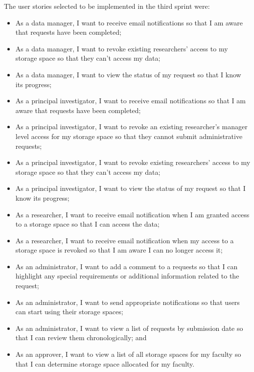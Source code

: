 \documentclass[a4paper,titlepage,12pt]{article}
\begin{document}
The user stories selected to be implemented in the third sprint were:

\begin{itemize}
	\item As a data manager, I want to receive email notifications so that
	      I am aware that requests have been completed;
	\item As a data manager, I want to revoke existing researchers' access
	      to my storage space so that they can't access my data;
	\item As a data manager, I want to view the status of my request so
	      that I know its progress;
	\item As a principal investigator, I want to receive email
	      notifications so that I am aware that requests have been
	      completed;
	\item As a principal investigator, I want to revoke an existing
	      researcher's manager level access for my storage space so that
	      they cannot submit administrative requests;
	\item As a principal investigator, I want to revoke existing
	      researchers' access to my storage space so that they can't access
	      my data;
	\item As a principal investigator, I want to view the status of my
	      request so that I know its progress;
	\item As a researcher, I want to receive email notification when I am
	      granted access to a storage space so that I can access the data;
	\item As a researcher, I want to receive email notification when my
	      access to a storage space is revoked so that I am aware I can no
	      longer access it;
	\item As an administrator, I want to add a comment to a requests so
	      that I can highlight any special requirements or additional
	      information related to the request;
	\item As an administrator, I want to send appropriate notifications so
	      that users can start using their storage spaces;
	\item As an administrator, I want to view a list of requests by
	      submission date so that I can review them chronologically; and
	\item As an approver, I want to view a list of all storage spaces for
	      my faculty so that I can determine storage space allocated for my
	      faculty.
\end{itemize}
\end{document}
